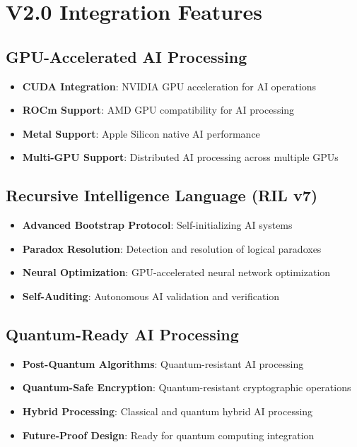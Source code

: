 \documentclass[12pt,a4paper]{article}
\begin{document}
\section{V2.0 Integration Features}

\subsection{GPU-Accelerated AI Processing}
\begin{itemize}
    \item \textbf{CUDA Integration}: NVIDIA GPU acceleration for AI operations
    \item \textbf{ROCm Support}: AMD GPU compatibility for AI processing
    \item \textbf{Metal Support}: Apple Silicon native AI performance
    \item \textbf{Multi-GPU Support}: Distributed AI processing across multiple GPUs
\end{itemize}

\subsection{Recursive Intelligence Language (RIL v7)}
\begin{itemize}
    \item \textbf{Advanced Bootstrap Protocol}: Self-initializing AI systems
    \item \textbf{Paradox Resolution}: Detection and resolution of logical paradoxes
    \item \textbf{Neural Optimization}: GPU-accelerated neural network optimization
    \item \textbf{Self-Auditing}: Autonomous AI validation and verification
\end{itemize}

\subsection{Quantum-Ready AI Processing}
\begin{itemize}
    \item \textbf{Post-Quantum Algorithms}: Quantum-resistant AI processing
    \item \textbf{Quantum-Safe Encryption}: Quantum-resistant cryptographic operations
    \item \textbf{Hybrid Processing}: Classical and quantum hybrid AI processing
    \item \textbf{Future-Proof Design}: Ready for quantum computing integration
\end{itemize}
\end{document}
